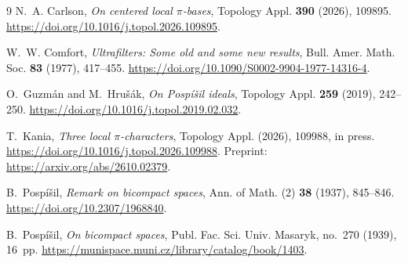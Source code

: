 \documentclass[11pt,a4paper]{amsart}
\theoremstyle{definition}
\theoremstyle{remark}
\begin{document}
\begin{thebibliography}{9}
N.~A. Carlson, \emph{On centered local $\pi$-bases},
Topology Appl. \textbf{390} (2026), 109895.
\url{https://doi.org/10.1016/j.topol.2026.109895}.

W.~W. Comfort, \emph{Ultrafilters: Some old and some new results},
Bull. Amer. Math. Soc. \textbf{83} (1977), 417--455.
\url{https://doi.org/10.1090/S0002-9904-1977-14316-4}.

O.~Guzm\'an and M.~Hru\v{s}\'ak, \emph{On Posp\'i\v{s}il ideals},
Topology Appl. \textbf{259} (2019), 242--250.
\url{https://doi.org/10.1016/j.topol.2019.02.032}.

T.~Kania, \emph{Three local $\pi$-characters},
Topology Appl. (2026), 109988, in press.
\url{https://doi.org/10.1016/j.topol.2026.109988}.
Preprint: \url{https://arxiv.org/abs/2610.02379}.

B.~Posp\'i\v{s}il, \emph{Remark on bicompact spaces},
Ann. of Math. (2) \textbf{38} (1937), 845--846.
\url{https://doi.org/10.2307/1968840}.

B.~Posp\'i\v{s}il, \emph{On bicompact spaces},
Publ. Fac. Sci. Univ. Masaryk, no.~270 (1939), 16~pp.
\url{https://munispace.muni.cz/library/catalog/book/1403}.
\end{thebibliography}
\end{document}
